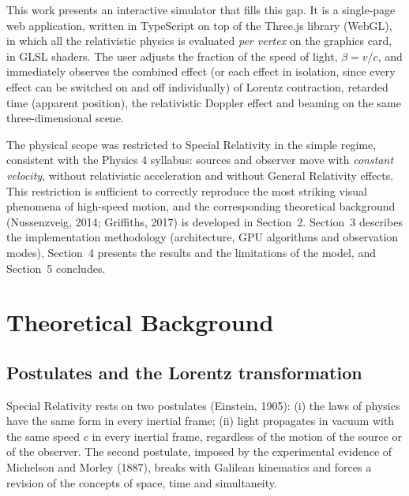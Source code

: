 \documentclass[10pt,a4paper,twocolumn]{article}
\begin{document}
This work presents an interactive simulator that fills this gap. It is a single-page web
application, written in TypeScript on top of the Three.js library (WebGL), in which all
the relativistic physics is evaluated \emph{per vertex} on the graphics card, in GLSL
shaders. The user adjusts the fraction of the speed of light, $\beta = v/c$, and
immediately observes the combined effect (or each effect in isolation, since every effect
can be switched on and off individually) of Lorentz contraction, retarded time (apparent
position), the relativistic Doppler effect and beaming on the same three-dimensional
scene.

The physical scope was restricted to Special Relativity in the simple regime, consistent
with the Physics 4 syllabus: sources and observer move with \emph{constant velocity},
without relativistic acceleration and without General Relativity effects. This
restriction is sufficient to correctly reproduce the most striking visual phenomena of
high-speed motion, and the corresponding theoretical background (Nussenzveig, 2014;
Griffiths, 2017) is developed in Section~2. Section~3 describes the implementation
methodology (architecture, GPU algorithms and observation modes), Section~4 presents the
results and the limitations of the model, and Section~5 concludes.

\section{Theoretical Background}

\subsection{Postulates and the Lorentz transformation}

Special Relativity rests on two postulates (Einstein, 1905): (i) the laws of physics have
the same form in every inertial frame; (ii) light propagates in vacuum with the same
speed $c$ in every inertial frame, regardless of the motion of the source or of the
observer. The second postulate, imposed by the experimental evidence of Michelson and
Morley (1887), breaks with Galilean kinematics and forces a revision of the concepts of
space, time and simultaneity.
\end{document}
